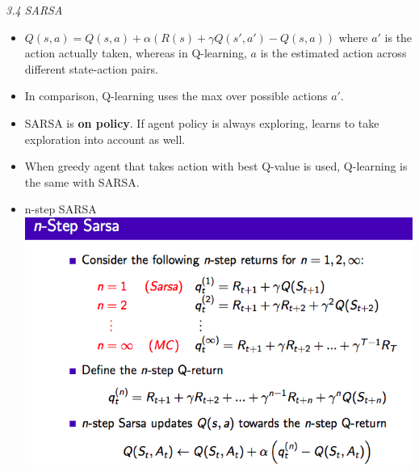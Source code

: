 \documentclass[12pt]{article}
\begin{document}
\noindent
\textsl{3.4 SARSA}
\begin{itemize}
\item
$Q(s, a) = Q(s, a) + \alpha(R(s) + \gamma {Q(s', a')} - Q(s, a))$ where $a'$ is the action actually taken, whereas in Q-learning, $a$ is the estimated action across different state-action pairs.
\item In comparison, Q-learning uses the max over possible actions $a'$.
\item SARSA is \textbf{on policy}. If agent policy is always exploring, learns to take exploration into account as well.
\item When greedy agent that takes action with best Q-value is used, Q-learning is the same with SARSA.
\item n-step SARSA \\

\includegraphics[scale=0.38]{sarsa}\\
\end{itemize}
\end{document}
